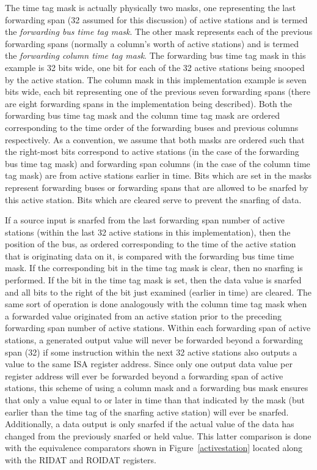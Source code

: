 \documentclass[10pt,dvips]{article}
\begin{document}
The time tag mask is actually physically two masks, one representing
the last forwarding span (32 assumed for this discussion) of active
stations and is termed the {\it forwarding bus time tag mask}.  The
other mask represents each of the previous forwarding spans (normally a
column's worth of active stations) and is termed the {\it forwarding
column time tag mask}.  The forwarding bus time tag mask in this
example is 32 bits wide, one bit for each of the 32 active stations
being snooped by the active station.  The column mask in this
implementation example is seven bits wide, each bit representing one
of the previous seven forwarding spans (there are eight forwarding
spans in the implementation being described).  Both the forwarding bus
time tag mask and the column time tag mask are ordered corresponding to
the time order of the forwarding buses and previous columns
respectively.  As a convention, we assume that both masks are ordered
such that the right-most bits correspond to active stations (in the
case of the forwarding bus time tag mask) and forwarding span columns
(in the case of the column time tag mask) are from active stations
earlier in time.  Bits which are set in the masks represent forwarding
buses or forwarding spans that are allowed to be snarfed by this active
station.  Bits which are cleared serve to prevent the snarfing of
data.

If a source input is snarfed from the last forwarding span number of
active stations (within the last 32 active stations in this
implementation), then the position of the bus, as ordered corresponding
to the time of the active station that is originating data on it, is
compared with the forwarding bus time time mask.  If the corresponding
bit in the time tag mask is clear, then no snarfing is performed.  If
the bit in the time tag mask is set, then the data value is snarfed and
all bits to the right of the bit just examined (earlier in time) are
cleared.  The same sort of operation is done analogously with the
column time tag mask when a forwarded value originated from an active
station prior to the preceding forwarding span number of active
stations.  Within each forwarding span of active stations, a generated
output value will never be forwarded beyond a forwarding span (32) if
some instruction within the next 32 active stations also outputs a
value to the same ISA register address.  Since only one output data
value per register address
will ever be forwarded beyond a forwarding span of active
stations, this scheme of using a column mask and a forwarding bus mask
ensures that only a value equal to or later in time than that indicated
by the mask (but earlier than
the time tag of the snarfing active station) will ever be snarfed.
Additionally, a data output is only snarfed if the actual value of the
data has changed from the previously snarfed or held value.  This
latter comparison is done with the equivalence comparators shown in
Figure~\ref{activestation} located along with the RIDAT and ROIDAT
registers.
\end{document}

